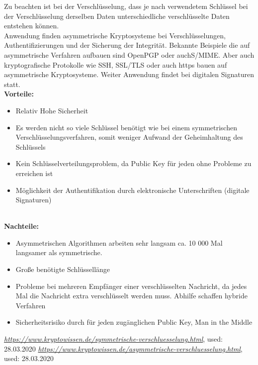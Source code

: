 \documentclass{report}
\begin{document}
Zu beachten ist bei der Verschlüsselung, dass je nach verwendetem Schlüssel bei der Verschlüsselung derselben Daten unterschiedliche verschlüsselte Daten entstehen können. \cite{2} \\


Anwendung finden asymmetrische Kryptosysteme bei Verschlüsselungen, Authentifizierungen und der Sicherung der Integrität. Bekannte Beispiele die auf asymmetrische Verfahren aufbauen sind OpenPGP oder auchS/MIME. Aber auch kryptografische Protokolle wie SSH, SSL/TLS oder auch https bauen auf asymmetrische Kryptosysteme. Weiter Anwendung findet bei digitalen Signaturen statt.\cite{2} \\

\textbf{Vorteile:}
\begin{itemize}
    \item Relativ Hohe Sicherheit
    \item Es werden nicht so viele Schlüssel benötigt wie bei einem symmetrischen Verschlüsselungsverfahren, somit weniger Aufwand der Geheimhaltung des Schlüssels
    \item Kein Schlüsselverteilungsproblem, da Public Key für jeden ohne Probleme zu erreichen ist
    \item Möglichkeit der Authentifikation durch elektronische Unterschriften (digitale Signaturen)
\end{itemize}
\cite{2} \\

\textbf{Nachteile:}
\begin{itemize}
    \item Asymmetrischen Algorithmen arbeiten sehr langsam ca. 10 000 Mal langsamer als symmetrische.
    \item Große benötigte Schlüssellänge
    \item Probleme bei mehreren Empfänger einer verschlüsselten Nachricht, da jedes Mal die Nachricht extra verschlüsselt werden muss. Abhilfe schaffen hybride Verfahren
    \item Sicherheitsrisiko durch für jeden zugänglichen Public Key, Man in the Middle
\end{itemize}
\cite{2}


\begin{thebibliography}{9}
     \emph{\url{https://www.kryptowissen.de/symmetrische-verschluesselung.html}}, used: 28.03.2020
     \emph{\url{https://www.kryptowissen.de/asymmetrische-verschluesselung.html}}, used: 28.03.2020
\end{thebibliography}
\end{document}
